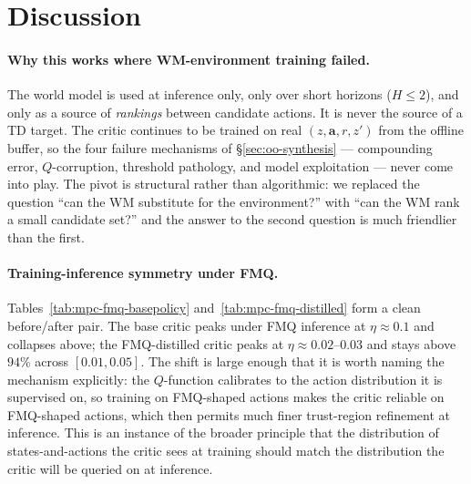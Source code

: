 \section{Discussion}
\label{sec:mpc-discussion}

\paragraph{Why this works where WM-environment training failed.} The world model is used at inference only, only over short horizons ($H \le 2$), and only as a source of \emph{rankings} between candidate actions. It is never the source of a TD target. The critic continues to be trained on real $(z, \mathbf{a}, r, z')$ from the offline buffer, so the four failure mechanisms of \S\ref{sec:oo-synthesis} --- compounding error, $Q$-corruption, threshold pathology, and model exploitation --- never come into play. The pivot is structural rather than algorithmic: we replaced the question ``can the WM substitute for the environment?'' with ``can the WM rank a small candidate set?'' and the answer to the second question is much friendlier than the first.

\paragraph{Training-inference symmetry under FMQ.} Tables~\ref{tab:mpc-fmq-basepolicy} and~\ref{tab:mpc-fmq-distilled} form a clean before/after pair. The base critic peaks under FMQ inference at $\eta \approx 0.1$ and collapses above; the FMQ-distilled critic peaks at $\eta \approx 0.02$--$0.03$ and stays above $94\%$ across $[0.01, 0.05]$. The shift is large enough that it is worth naming the mechanism explicitly: the $Q$-function calibrates to the action distribution it is supervised on, so training on FMQ-shaped actions makes the critic reliable on FMQ-shaped actions, which then permits much finer trust-region refinement at inference. This is an instance of the broader principle that the distribution of states-and-actions the critic sees at training should match the distribution the critic will be queried on at inference.

